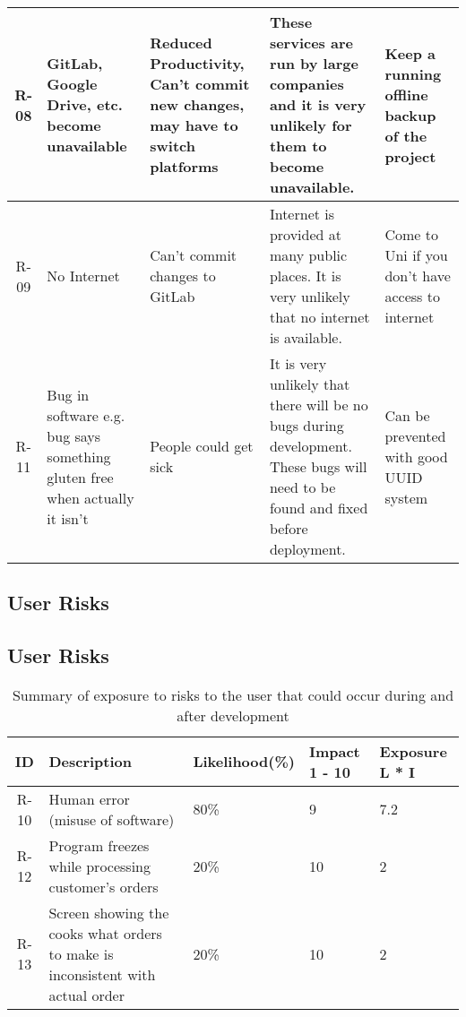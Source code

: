 \begin{table}[H]
\begin{tabularx}{\linewidth}{|c|X|X|X|X|}
    \hline
    R-08 & GitLab, Google Drive, etc. become unavailable & Reduced Productivity, Can’t commit new changes, may have to switch platforms & These services are run by large companies and it is very unlikely for them to become unavailable. & Keep a running offline backup of the project \\
    \hline
    R-09 & No Internet & Can’t commit changes to GitLab & Internet is provided at many public places. It is very unlikely that no internet is available. & Come to Uni if you don’t have access to internet \\
    \hline
    R-11 & Bug in software e.g. bug says something gluten free when actually it isn’t & People could get sick & It is very unlikely that there will be no bugs during development. These bugs will need to be found and fixed before deployment. & Can be prevented with good UUID system \\
    \hline
\end{tabularx}
\end{table}

\subsection{User Risks}

\subsection{User Risks}

\begin{table}[!ht]
\centering
\caption{Summary of exposure to risks to the user that could occur during and after development}
\begin{tabularx}{\linewidth}{|c|X|X|X|X|}
	\hline
    ID & Description & Likelihood(\%) & Impact
    1 - 10 & Exposure
    L * I \\
    \hline
    R-10 & Human error (misuse of software) & 80\% & 9 & 7.2 \\
    \hline
    R-12 & Program freezes while processing customer’s orders & 20\% & 10 & 2 \\
    \hline
    R-13 & Screen showing the cooks what orders to make is inconsistent with actual order & 20\% & 10 & 2 \\
    \hline
\end{tabularx}
\end{table}

